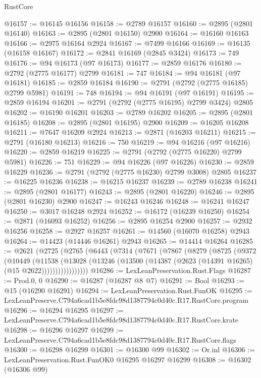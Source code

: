 \begin{lexlean}{RustCore}
\begin{coremodule}
@16157 := @16145 @16156
@16158 := @2789 @16157
@16160 := @2895 (@2801 @16140)
@16163 := @2895 (@2801 @16150) @2900
@16164 := @16160 @16163
@16166 := @2975 @16164 @2924
@16167 := @7499 @16166
@16169 := @16135 (@16158 @16167)
@16172 := @2841 @16169 (@2845 @3424)
@16173 := 749
@16176 := @94 @16173 (@97 @16173)
@16177 := @2859 @16176
@16180 := @2792 (@2775 @16177) @2799
@16181 := 747
@16184 := @94 @16181 (@97 @16181)
@16185 := @2859 @16184
@16190 := @2791 (@2792 (@2775 @16185) @2799 @5981)
@16191 := 748
@16194 := @94 @16191 (@97 @16191)
@16195 := @2859 @16194
@16201 := @2791 (@2792 (@2775 @16195) @2799 @3424) @2805
@16202 := @16190 @16201
@16203 := @2789 @16202
@16205 := @2895 (@2801 @16185)
@16208 := @2895 (@2801 @16195) @2900
@16209 := @16205 @16208
@16211 := @7647 @16209 @2924
@16213 := @2871 (@16203 @16211)
@16215 := @2791 (@16180 @16213)
@16216 := 750
@16219 := @94 @16216 (@97 @16216)
@16220 := @2859 @16219
@16225 := @2791 (@2792 (@2775 @16220) @2799 @5981)
@16226 := 751
@16229 := @94 @16226 (@97 @16226)
@16230 := @2859 @16229
@16236 := @2791 (@2792 (@2775 @16230) @2799 @3008) @2805
@16237 := @16225 @16236
@16238 := @16215 @16237
@16239 := @2789 @16238
@16241 := @2895 (@2801 @16177)
@16243 := @2895 (@2801 @16220)
@16246 := @2895 (@2801 @16230) @2900
@16247 := @16243 @16246
@16248 := @16241 @16247
@16250 := @3017 @16248 @2924
@16252 := @16172 (@16239 @16250)
@16254 := @2871 (@16093 @16252)
@16256 := @2895 @16254 @2900
@16257 := @2932 @16256
@16258 := @2927 @16257
@16261 := @14560 (@16070 @16258) @2943
@16264 := @14423 (@14446 @16261) @2943
@16265 := @14414 @16264
@16285 := @2621
    (@2725
      (@2765
        (@6443
          (@7314
            (@7671
              (@7867
                (@8279
                  (@8725
                    (@9372
                      (@10449
                        (@11538
                          (@13028
                            (@13246
                              (@13500 (@14387 (@2623 (@14391 @16265) (@15 @2622)))))))))))))))))
@16286 := LexLeanPreservation.Rust.Flags
@16287 := Prod.{0, 0}
@16290 := @16287 (@16287 @8 @7)
@16291 := Bool
@16293 := @15 (@16290 @16291)
@16294 := LexLeanPreservation.Rust.FunOK
@16295 := LexLeanPreserve.C794a6cad1b5e8fdc98d1387794c0d40c.R17.RustCore.program
@16296 := @16294 @16295
@16297 := LexLeanPreserve.C794a6cad1b5e8fdc98d1387794c0d40c.R17.RustCore.krate
@16298 := @16296 @16297
@16299 := LexLeanPreserve.C794a6cad1b5e8fdc98d1387794c0d40c.R17.RustCore.flags
@16300 := @16298 @16299
@16301 := @16300 @99
@16302 := Or.inl
@16306 := LexLeanPreservation.Rust.FunOK0 @16295 @16297 @16299
@16308 := @16302 (@16306 @99)

\end{coremodule}
\end{lexlean}

